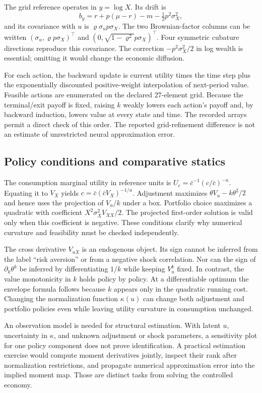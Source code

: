 \documentclass[ecta,nameyear,draft]{econsocart}
\theoremstyle{definition}
\theoremstyle{remark}
\begin{document}
The grid reference operates in $y=\log X$. Its drift is
\[
 b_y=r+p(\mu-r)-m-\tfrac12p^2\sigma_X^2,
\]
and its covariance with $u$ is $\varrho\sigma_u p\sigma_X$. The two Brownian-factor columns can be written $(\sigma_u,\varrho p\sigma_X)^\top$ and $(0,\sqrt{1-\varrho^2}p\sigma_X)^\top$. Four symmetric cubature directions reproduce this covariance. The correction $-p^2\sigma_X^2/2$ in log wealth is essential; omitting it would change the economic diffusion.

For each action, the backward update is current utility times the time step plus the exponentially discounted positive-weight interpolation of next-period value. Feasible actions are enumerated on the declared 27-element grid. Because the terminal/exit payoff is fixed, raising $k$ weakly lowers each action's payoff and, by backward induction, lowers value at every state and time. The recorded arrays permit a direct check of this order. The reported grid-refinement difference is not an estimate of unrestricted neural approximation error.

\subsection{Policy conditions and comparative statics}
The consumption marginal utility in reference units is $U_c=\bar c^{-1}(c/\bar c)^{-u}$. Equating it to $V_X$ yields $c=\bar c(\bar cV_X)^{-1/u}$. Adjustment maximizes $\theta V_u-k\theta^2/2$ and hence uses the projection of $V_u/k$ under a box. Portfolio choice maximizes a quadratic with coefficient $X^2\sigma_X^2V_{XX}/2$. The projected first-order solution is valid only when this coefficient is negative. These conditions clarify why numerical curvature and feasibility must be checked independently.

The cross derivative $V_{uX}$ is an endogenous object. Its sign cannot be inferred from the label ``risk aversion'' or from a negative shock correlation. Nor can the sign of $\partial_k\theta^k$ be inferred by differentiating $1/k$ while keeping $V_u^k$ fixed. In contrast, the value monotonicity in $k$ holds policy by policy. At a differentiable optimum the envelope formula follows because $k$ appears only in the quadratic running cost. Changing the normalization function $\kappa(u)$ can change both adjustment and portfolio policies even while leaving utility curvature in consumption unchanged.

An observation model is needed for structural estimation. With latent $u$, uncertainty in $\kappa$, and unknown adjustment or shock parameters, a sensitivity plot for one policy component does not prove identification. A practical estimation exercise would compute moment derivatives jointly, inspect their rank after normalization restrictions, and propagate numerical approximation error into the implied moment map. Those are distinct tasks from solving the controlled economy.
\end{document}
